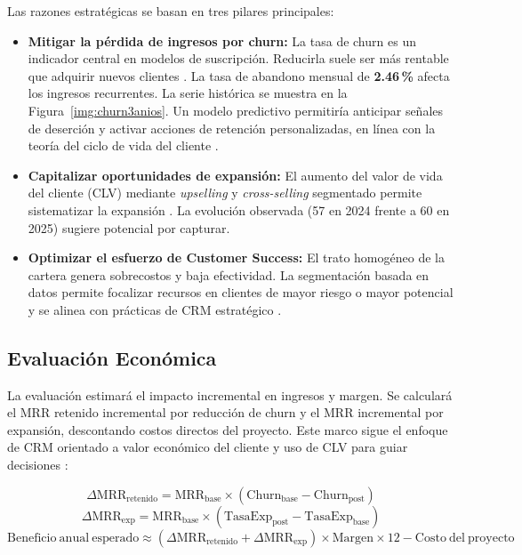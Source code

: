 Las razones estratégicas se basan en tres pilares principales:  
\begin{itemize}
    \item \textbf{Mitigar la pérdida de ingresos por churn:} La tasa de churn es un indicador central en modelos de suscripción. Reducirla suele ser más rentable que adquirir nuevos clientes \citep{Gupta2006}. La tasa de abandono mensual de \textbf{2.46\,\%} afecta los ingresos recurrentes. La serie histórica se muestra en la Figura~\ref{img:churn3anios}. Un modelo predictivo permitiría anticipar señales de deserción y activar acciones de retención personalizadas, en línea con la teoría del ciclo de vida del cliente \citep{Lemmens2008}.
    \item \textbf{Capitalizar oportunidades de expansión:} El aumento del valor de vida del cliente (CLV) mediante \textit{upselling} y \textit{cross-selling} segmentado permite sistematizar la expansión \citep{Kumar2010}. La evolución observada (57 en 2024 frente a 60 en 2025) sugiere potencial por capturar.
    \item \textbf{Optimizar el esfuerzo de Customer Success:} El trato homogéneo de la cartera genera sobrecostos y baja efectividad. La segmentación basada en datos permite focalizar recursos en clientes de mayor riesgo o mayor potencial y se alinea con prácticas de CRM estratégico \citep{Kumar2010}.
\end{itemize}

\subsection{Evaluación Económica}

La evaluación estimará el impacto incremental en ingresos y margen. Se calculará el MRR retenido incremental por reducción de churn y el MRR incremental por expansión, descontando costos directos del proyecto. Este marco sigue el enfoque de CRM orientado a valor económico del cliente y uso de CLV para guiar decisiones \citep{Kumar2010}:

\[
\Delta \mathrm{MRR}_{\mathrm{retenido}} = \mathrm{MRR}_{\mathrm{base}} \times (\mathrm{Churn}_{\mathrm{base}} - \mathrm{Churn}_{\mathrm{post}})
\]
\[
\Delta \mathrm{MRR}_{\mathrm{exp}} = \mathrm{MRR}_{\mathrm{base}} \times (\mathrm{TasaExp}_{\mathrm{post}} - \mathrm{TasaExp}_{\mathrm{base}})
\]
\[
\mathrm{Beneficio\ anual\ esperado} \approx (\Delta \mathrm{MRR}_{\mathrm{retenido}} + \Delta \mathrm{MRR}_{\mathrm{exp}}) \times \mathrm{Margen} \times 12 - \mathrm{Costo\ del\ proyecto}
\]

